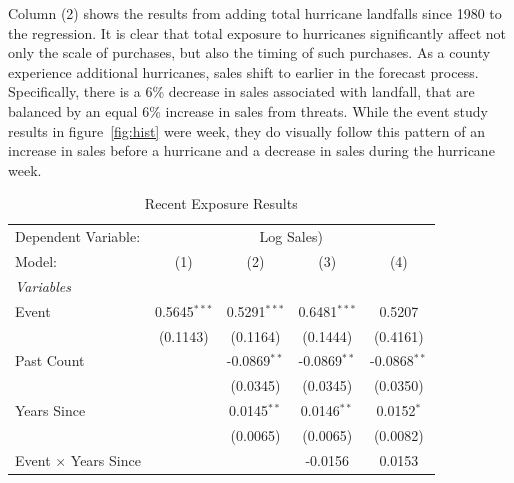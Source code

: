 \documentclass{article}
\begin{document}
Column (2) shows the results from adding total hurricane landfalls since 1980 to the regression. It is clear that total exposure to hurricanes significantly affect not only the scale of purchases, but also the timing of such purchases. As a county experience additional hurricanes, sales shift to earlier in the forecast process. Specifically, there is a 6\% decrease in sales associated with landfall, that are balanced by an equal 6\% increase in sales from threats. While the event study results in figure~\ref{fig:hist} were week, they do visually follow this pattern of an increase in sales before a hurricane and a decrease in sales during the hurricane week. 


\begin{table}[htbp]
   \caption{Recent Exposure Results}
   \centering
   \begin{tabular}{lcccc}
      \tabularnewline \midrule \midrule
      Dependent Variable: & \multicolumn{4}{c}{Log Sales)}\\
      Model:                                                                & (1)            & (2)            & (3)            & (4)\\  
      \midrule
      \emph{Variables}\\
      Event                                                                 & 0.5645$^{***}$ & 0.5291$^{***}$ & 0.6481$^{***}$ & 0.5207\\   
                                                                            & (0.1143)       & (0.1164)       & (0.1444)       & (0.4161)\\   
        Past Count                                                       &                & -0.0869$^{**}$ & -0.0869$^{**}$ & -0.0868$^{**}$\\   
                                                                            &                & (0.0345)       & (0.0345)       & (0.0350)\\   
      Years Since                                                &                & 0.0145$^{**}$  & 0.0146$^{**}$  & 0.0152$^{*}$\\   
                                                                            &                & (0.0065)       & (0.0065)       & (0.0082)\\   
      Event $\times$ Years Since                                 &                &                & -0.0156        & 0.0153\\   

\end{tabular}
\end{table}
\end{document}
